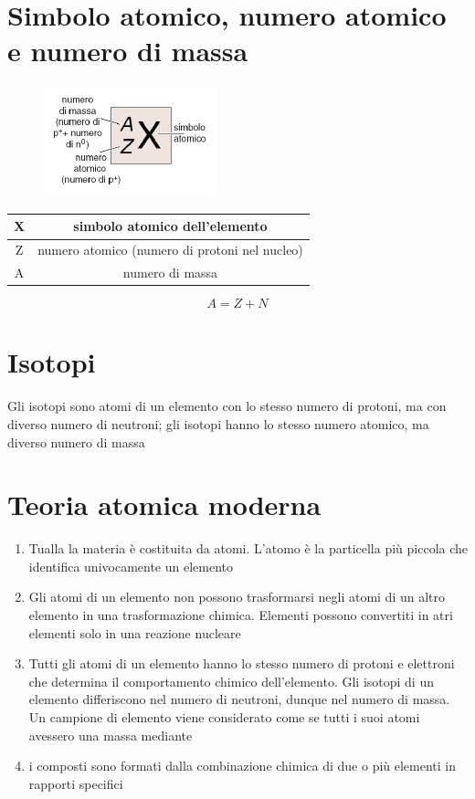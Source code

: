 \documentclass[a4paper,11pt]{report}
\begin{document}
\section{Simbolo atomico, numero atomico e numero di massa}

\begin{figure}[H]
	\centering
	\includegraphics[width=0.2\linewidth, height=\textheight,keepaspectratio]{immagini/numero.png}
	\label{fig:numero}
\end{figure}

\begin{center}
\begin{tabular}{|c|c|}
	\hline
	X & simbolo atomico dell'elemento \\
	\hline
	Z & numero atomico (numero di protoni nel nucleo) \\
	\hline
	A & numero di massa	\\
	\hline
\end{tabular}
\end{center}

\[A = Z+N\]

\section{Isotopi}

Gli isotopi sono atomi di un elemento con lo stesso numero di protoni, ma con diverso numero di neutroni; gli isotopi hanno lo stesso numero atomico, ma diverso numero di massa

\section{Teoria atomica moderna}

\begin{enumerate}
	\item Tualla la materia è costituita da atomi. L'atomo è la particella più piccola che identifica univocamente un elemento 
 \item Gli atomi di un elemento non possono trasformarsi negli atomi di un altro elemento in una trasformazione chimica. Elementi possono convertiti in atri elementi solo in una reazione nucleare 
 \item Tutti gli atomi di un elemento hanno lo stesso numero di protoni e elettroni che determina il comportamento chimico dell'elemento. Gli isotopi di un elemento differiscono nel numero di neutroni, dunque nel numero di massa. Un campione di elemento viene considerato come se tutti i suoi atomi avessero una massa mediante
 \item i composti sono formati dalla combinazione chimica di due o più elementi in rapporti specifici
\end{enumerate}
\end{document}
